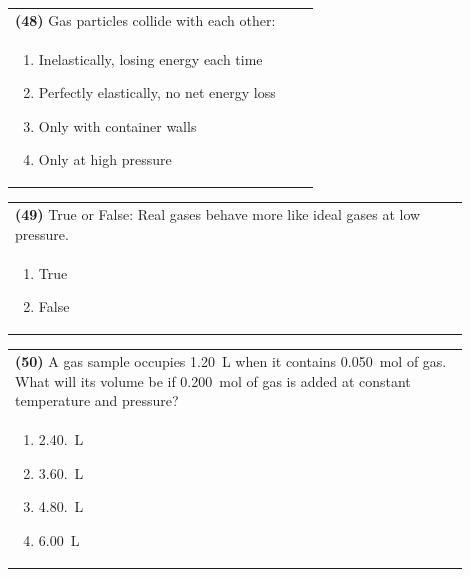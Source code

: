 \documentclass{article}
\begin{document}
{{\vspace{0.2cm}
\noindent\begin{tabular}{|p{0.9\linewidth}|}
\hline
\textbf{(48)} Gas particles collide with each other:\\[0.2cm]

\begin{minipage}[t]{0.85\linewidth}
\begin{enumerate}[label=\alph*.]
\item Inelastically, losing energy each time
\item Perfectly elastically, no net energy loss
\item Only with container walls
\item Only at high pressure
\end{enumerate}
\end{minipage}\\[0.2cm]
\hline
\end{tabular}

\newpage

\noindent\begin{tabular}{|p{0.9\linewidth}|}
\hline
\textbf{(49)} True or False: Real gases behave more like ideal gases at low pressure.\\[0.2cm]

\begin{minipage}[t]{0.85\linewidth}
\begin{enumerate}[label=\alph*.]
\item True
\item False
\end{enumerate}
\end{minipage}\\[0.2cm]
\hline
\end{tabular}

\vspace{0.2cm}
\noindent\begin{tabular}{|p{0.9\linewidth}|}
\hline
\textbf{(50)} A gas sample occupies 1.20~L when it contains 0.050~mol of gas. What will its volume be if 0.200~mol of gas is added at constant temperature and pressure? \\[0.2cm]

\begin{minipage}[t]{0.85\linewidth}
\begin{enumerate}[label=\alph*.]
\item 2.40.~L
\item 3.60.~L
\item 4.80.~L
\item 6.00~L
\end{enumerate}
\end{minipage}\\[0.2cm]
\hline
\end{tabular}

}}
\end{document}

